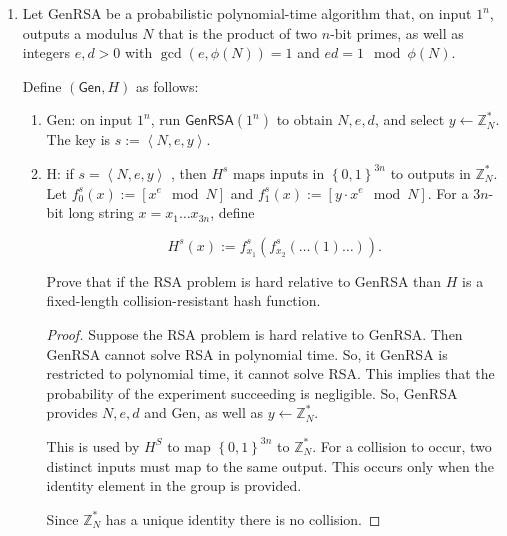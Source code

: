 \documentclass{article}
\begin{document}
\begin{enumerate}
\begin{enumerate}
        \begin{proof}
            Suppose that DDH is hard relative to $\mathcal{G}$. Then Pr[$DDH_{\mathcal{A}, \mathcal{G}}$=1] $\leq$ negl(n). Now consider the CDH problem. If CDH is easy, DDH is also easy. By contraposition, if DDH is hard, CDH is hard. This implies that CDH is hard, so Pr[$CDH_{\mathcal{A}, \mathcal{G}}$=1] $\leq$ negl(n). Because the experiment has a negligible chance of succeeding, the CDH problem is hard relative to $\mathcal{G}$.
        \end{proof}
    \end{enumerate}
  \item Let \textsf{GenRSA} be a probabilistic polynomial-time algorithm that,
    on input $1^n$, outputs a modulus $N$ that is the product of two $n$-bit 
    primes, as well as integers $e, d > 0$ with $\gcd(e, \phi(N)) = 1$ and 
    $ed = 1 \mod \phi(N)$.

    Define $(\textsf{Gen}, H)$ as follows:

    \begin{enumerate}
      \item \textsf{Gen}: on input $1^n$, run $\textsf{GenRSA}(1^n)$ to obtain
        $N, e, d$, and select $y \leftarrow \mathbb{Z}^{*}_N$. The key is $s := \left<N, e,
        y\right>$.

      \item \textsf{H}: if $s = \left<N, e, y\right>$ , then $H^s$ maps inputs
        in $\left\{0, 1\right\}^{3n}$ to outputs in $\mathbb{Z}^{*}_N$. Let $f_0^s(x) :=
        [x^e \mod N]$ and $f_1^s(x) := [y \cdot x^e \mod N]$. For a $3n$-bit long
        string $x = x_1 \dots x_{3n}$, define

        \[
          H^s(x) := f_{x_1}^s(f_{x_2}^s(\dots(1)\dots)).
        \]

        Prove that if the RSA problem is hard relative to \textsf{GenRSA} than
        $H$ is a fixed-length collision-resistant hash function.

        \begin{proof}
          Suppose the RSA problem is hard relative to \textsf{GenRSA}. Then
          \textsf{GenRSA} cannot solve \textsf{RSA} in polynomial time. So, it
          \textsf{GenRSA} is restricted to polynomial time, it cannot solve
          \textsf{RSA}. This implies that the probability of the experiment
          succeeding is negligible.
          So, \textsf{GenRSA} provides $N, e, d$ and \textsf{Gen}, as well as $y
          \leftarrow \mathbb{Z}^{*}_{N}$.

          This is used by $H^S$ to map $\left\{0, 1\right\}^{3n}$ to
          $\mathbb{Z}^{*}_{N}$. For a collision to occur, two distinct inputs
          must map to the same output. This occurs only when the identity
          element in the group is provided.

          Since $\mathbb{Z}^{*}_N$ has a unique identity there is no collision.
        \end{proof}

    \end{enumerate}
\end{enumerate}
\end{document}
